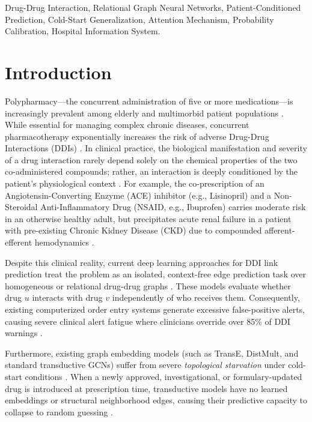 \documentclass[conference]{IEEEtran}
\begin{document}
\begin{IEEEkeywords}
Drug-Drug Interaction, Relational Graph Neural Networks, Patient-Conditioned Prediction, Cold-Start Generalization, Attention Mechanism, Probability Calibration, Hospital Information System.
\end{IEEEkeywords}

\section{Introduction}
Polypharmacy---the concurrent administration of five or more medications---is increasingly prevalent among elderly and multimorbid patient populations \cite{zitnik2018modeling, percha2013informatics}. While essential for managing complex chronic diseases, concurrent pharmacotherapy exponentially increases the risk of adverse Drug-Drug Interactions (DDIs) \cite{almirall2014multimorbidity, dreischulte2015combined}. In clinical practice, the biological manifestation and severity of a drug interaction rarely depend solely on the chemical properties of the two co-administered compounds; rather, an interaction is deeply conditioned by the patient's physiological context \cite{chou2021designing}. For example, the co-prescription of an Angiotensin-Converting Enzyme (ACE) inhibitor (e.g., Lisinopril) and a Non-Steroidal Anti-Inflammatory Drug (NSAID, e.g., Ibuprofen) carries moderate risk in an otherwise healthy adult, but precipitates acute renal failure in a patient with pre-existing Chronic Kidney Disease (CKD) due to compounded afferent-efferent hemodynamics \cite{dreischulte2015combined}.

Despite this clinical reality, current deep learning approaches for DDI link prediction treat the problem as an isolated, context-free edge prediction task over homogeneous or relational drug-drug graphs \cite{feng2022deep, lin2020kgnn, han2022smilegnn}. These models evaluate whether drug $u$ interacts with drug $v$ independently of who receives them. Consequently, existing computerized order entry systems generate excessive false-positive alerts, causing severe clinical alert fatigue where clinicians override over 85\% of DDI warnings \cite{hussain2019medication, slight2020high, nanji2018medication}.

Furthermore, existing graph embedding models (such as TransE, DistMult, and standard transductive GCNs) suffer from severe \textit{topological starvation} under cold-start conditions \cite{schlichtkrull2018modeling, kipf2017semi}. When a newly approved, investigational, or formulary-updated drug is introduced at prescription time, transductive models have no learned embeddings or structural neighborhood edges, causing their predictive capacity to collapse to random guessing \cite{zhang2018link}.
\end{document}
